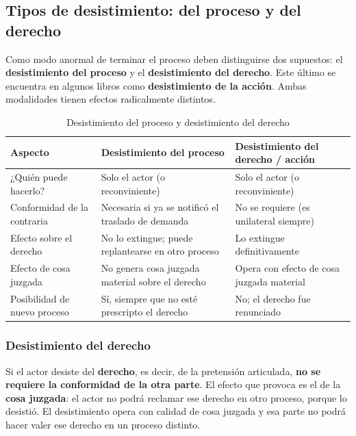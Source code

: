 \documentclass[12pt,oneside]{book}
\begin{document}
\subsection{Tipos de desistimiento: del proceso y del derecho}

Como modo anormal de terminar el proceso deben distinguirse dos supuestos: el \textbf{desistimiento del proceso} y el \textbf{desistimiento del derecho}. Este último se encuentra en algunos libros como \textbf{desistimiento de la acción}. Ambas modalidades tienen efectos radicalmente distintos.

\begin{table}[H]
\centering
\caption{Desistimiento del proceso y desistimiento del derecho}
\small
\begin{tabularx}{\textwidth}{
    >{\raggedright\arraybackslash}p{}
    >{\raggedright\arraybackslash}X
    >{\raggedright\arraybackslash}X
}
\toprule
\textbf{Aspecto} & \textbf{Desistimiento del proceso} & \textbf{Desistimiento del derecho / acción} \\
\midrule
¿Quién puede hacerlo? & Solo el actor (o reconviniente) & Solo el actor (o reconviniente) \\
Conformidad de la contraria & Necesaria si ya se notificó el traslado de demanda & No se requiere (es unilateral siempre) \\
Efecto sobre el derecho & No lo extingue; puede replantearse en otro proceso & Lo extingue definitivamente \\
Efecto de cosa juzgada & No genera cosa juzgada material sobre el derecho & Opera con efecto de cosa juzgada material \\
Posibilidad de nuevo proceso & Sí, siempre que no esté prescripto el derecho & No; el derecho fue renunciado \\
\bottomrule
\end{tabularx}
\end{table}

\subsubsection{Desistimiento del derecho}

Si el actor desiste del \textbf{derecho}, es decir, de la pretensión articulada, \textbf{no se requiere la conformidad de la otra parte}. El efecto que provoca es el de la \textbf{cosa juzgada}: el actor no podrá reclamar ese derecho en otro proceso, porque lo desistió. El desistimiento opera con calidad de cosa juzgada y esa parte no podrá hacer valer ese derecho en un proceso distinto.
\end{document}
